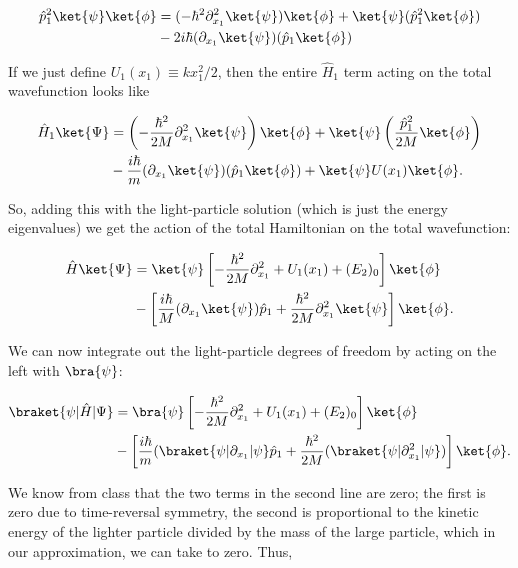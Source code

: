 \begin{align}
  \hat{p}_1^2\ket{\psi}\ket{\phi} &= (-\hbar^2\partial_{x_1}^2 \ket{\psi})\ket{\phi} + \ket{\psi}(\hat{p}_1^2 \ket{\phi}) \\ 
                                          & -2i\hbar (\partial_{x_1} \ket{\psi})(\hat{p}_1\ket{\phi})
\end{align}

If we just define $U_1(x_1) \equiv kx_1^2/2$, then the entire $\hat{H}_1$ term acting on the total wavefunction looks like

\begin{align}
  \hat{H}_1\ket{\Psi} &= \left( -\frac{\hbar^2}{2M}\partial_{x_1}^2 \ket{\psi} \right)\ket{\phi} + \ket{\psi}\left( \frac{\hat{p}_1^2}{2M} \ket{\phi} \right) \\
                      & - \frac{i\hbar}{m}(\partial_{x_1}\ket{\psi})(\hat{p}_1 \ket{\phi}) + \ket{\psi} U(x_1) \ket{\phi}.
\end{align}

So, adding this with the light-particle solution (which is just the energy eigenvalues) we get the action of the total Hamiltonian on the total wavefunction:

\begin{align}                        
  \hat{H}\ket{\Psi} &= \ket{\psi}\left[ - \frac{\hbar^2}{2M}\partial_{x_1}^2 + U_1(x_1) + (E_2)_0 \right] \ket{\phi} \\
                    & - \left[ \frac{i\hbar}{M}(\partial_{x_1} \ket{\psi})\hat{p}_1 + \frac{\hbar^2}{2M} \partial_{x_1}^2 \ket{\psi} \right]\ket{\phi}.
\end{align}

We can now integrate out the light-particle degrees of freedom by acting on the left with $\bra{\psi}$:

\begin{align}
  \braket{\psi | \hat{H} | \Psi} &= \bra{\psi} \left[ - \frac{\hbar^2}{2M}\partial_{x_1}^2 + U_1(x_1) + (E_2)_0 \right]\ket{\phi} \\
                                       & - \left[ \frac{i\hbar}{m}(\braket{\psi | \partial_{x_1} | \psi}\hat{p}_1 + \frac{\hbar^2}{2M}(\braket{\psi | \partial_{x_1}^2 | \psi}) \right] \ket{\phi}.
\end{align}

We know from class that the two terms in the second line are zero; the first is zero due to time-reversal symmetry, the second is proportional to the kinetic energy of the lighter particle divided by the mass of the large particle, which in our approximation, we can take to zero. Thus,

